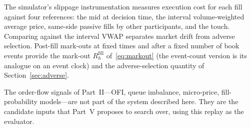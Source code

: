 The simulator's slippage instrumentation measures execution cost for each fill against four
references: the mid at decision time, the interval volume-weighted average price, same-side
passive fills by other participants, and the touch. Comparing against the interval VWAP separates
market drift from adverse selection. Post-fill mark-outs at fixed times and after a fixed number
of book events provide the mark-out $R^{\text{fill}}_{h}$ of~\eqref{eq:markout} (the event-count version is
its analogue on an event clock) and the adverse-selection quantity of Section~\ref{sec:adverse}.

The order-flow signals of Part~II---OFI, queue imbalance, micro-price, fill-probability
models---are not part of the system described here. They are the candidate inputs that
Part~V proposes to search over, using this replay as the evaluator.
